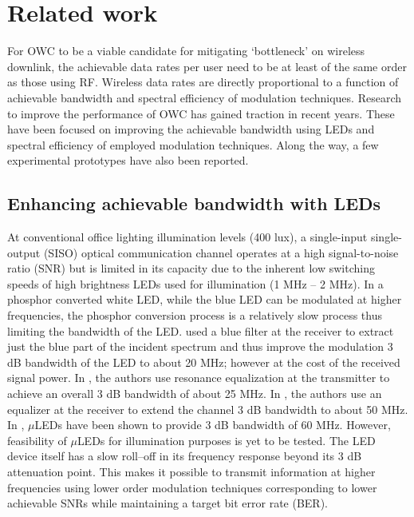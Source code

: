 \section{Related work}
\label{sec:related}
\graphicspath{{_Intro/Figures/}}

For OWC to be a viable candidate for mitigating `bottleneck' on wireless downlink, the achievable data rates per user need to be at least of the same order as those using RF. Wireless data rates are directly proportional to a function of achievable bandwidth and spectral efficiency of modulation techniques. Research to improve the performance of OWC has gained traction in recent years. These have been focused on improving the achievable bandwidth using LEDs and spectral efficiency of employed modulation techniques. Along the way, a few experimental prototypes have also been reported. 

\subsection{Enhancing achievable bandwidth with LEDs}
\label{relatedBandwidth}
At conventional office lighting illumination levels (400 lux), a single-input single-output (SISO) optical communication channel operates at a high signal-to-noise ratio (SNR) but is limited in its capacity due to the inherent low switching speeds of high brightness LEDs used for illumination (1 MHz -- 2 MHz). In a phosphor converted white LED, while the blue LED can be modulated at higher frequencies, the phosphor conversion process is a relatively slow process thus limiting the bandwidth of the LED. \cite{gru08b} used a blue filter at the receiver to extract just the blue part of the incident spectrum and thus improve the modulation 3 dB bandwidth of the LED to about 20 MHz; however at the cost of the received signal power.  In \cite{min08a}, the authors use resonance equalization at the transmitter to achieve an overall 3 dB bandwidth of about 25 MHz. In \cite{zen08a}, the authors use an equalizer at the receiver to extend the channel 3 dB bandwidth to about 50 MHz. In \cite{tso14a}, $\mu$LEDs have been shown to provide 3 dB bandwidth of 60 MHz. However, feasibility of $\mu$LEDs for illumination purposes is yet to be tested. The LED device itself has a slow roll--off in its frequency response beyond its 3 dB attenuation point. This makes it possible to transmit information at higher frequencies using lower order modulation techniques corresponding to lower achievable SNRs while maintaining a target bit error rate (BER).

